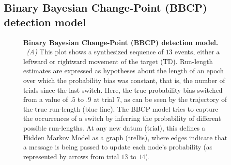 \documentclass[10pt,letterpaper]{article}
\newcommand{\seeFig}[1]{Figure~\ref{fig:#1}}
\begin{document}
\subsection*{Binary Bayesian Change-Point (BBCP) detection model}
\label{sec:Binary_Bayesian_change_point}
\begin{figure}%
\caption{\textbf{Binary Bayesian Change-Point (BBCP) detection model.}
~\textit{(A)}
This plot shows a synthesized sequence of $13$ events,
either a leftward or rightward movement of the target (TD).
Run-length estimates are expressed as hypotheses about the length of an epoch
over which the probability bias was constant,
that is, the number of trials since the last switch.
Here, the true probability bias switched from a value of $.5$ to $.9$ at trial $7$,
as can be seen by the trajectory of the true run-length (blue line).
The BBCP model tries to capture the occurrences of a switch
by inferring the probability of different possible run-lengths.
At any new datum (trial), this defines a Hidden Markov Model
as a graph (trellis), where %
edges indicate that a message is being passed
to update each node's probability (as represented by arrows from trial $13$ to $14$).
}
\end{figure}
\end{document}
